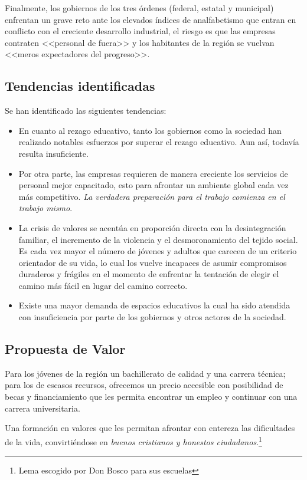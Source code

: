 Finalmente, los gobiernos de los tres órdenes (federal, estatal y municipal) enfrentan un grave reto ante los elevados índices de analfabetismo que entran en conflicto con el creciente desarrollo industrial, el riesgo es que las empresas contraten <<personal de fuera>> y los habitantes de la región se vuelvan <<meros expectadores del progreso>>.

\subsection{Tendencias identificadas}

Se han identificado las siguientes tendencias:

\begin{itemize}
	\item En cuanto al rezago educativo, tanto los gobiernos como la sociedad han realizado notables esfuerzos por superar el rezago educativo. Aun así, todavía resulta insuficiente.
	\item Por otra parte, las empresas requieren de manera creciente los servicios de personal mejor capacitado, esto para afrontar un ambiente global cada vez más competitivo. \emph{La verdadera preparación para el trabajo comienza en el trabajo mismo}.
	\item La crisis de valores se acentúa en proporción directa con la desintegración familiar, el incremento de la violencia y el desmoronamiento del tejido social. Es cada vez mayor el número de jóvenes y adultos que carecen de un criterio orientador de su vida, lo cual los vuelve incapaces de asumir compromisos duraderos y frágiles en el momento de enfrentar la tentación de elegir el camino más fácil en lugar del camino correcto.
	\item Existe una mayor demanda de espacios educativos la cual ha sido atendida con insuficiencia por parte de los gobiernos y otros actores de la sociedad.
\end{itemize}

\subsection{Propuesta de Valor}

Para los jóvenes de la región un bachillerato de calidad y una carrera técnica; para los de escasos recursos, ofrecemos un precio accesible con posibilidad de becas y financiamiento que les permita encontrar un empleo y continuar con una carrera universitaria.

Una formación en valores que les permitan afrontar con entereza las dificultades de la vida, convirtiéndose en \emph{buenos cristianos y honestos ciudadanos}.\footnote{Lema escogido por Don Bosco para sus escuelas}

